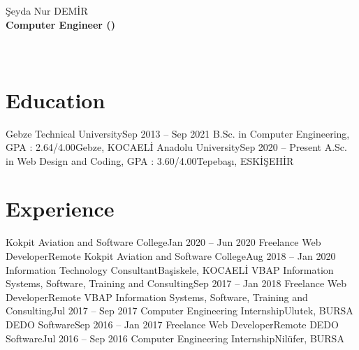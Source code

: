 \documentclass{main} %
\begin{document}
\resumeHeadStart
    \resumeTitleStart
        {\huge Şeyda Nur DEMİR } \\ 
    \resumeTitleEnd
    \resumeTitleAltStart
        {\textbf{Computer Engineer (\appliedPosition)}} \\ 
    \resumeTitleAltEnd
    \resumeTitleAltStart
        {\href{tel:+905063759015} {} 
        \href{mailto:dmrsydnr@gmail.com} {} 
        \href{https://goo.gl/maps/RmZTWTc4JpxoeGfH6} {} } \\ 
    \resumeTitleAltEnd
    \resumeTitleAltStart
        {\href{https://seydanurdemir.com} {} 
        \href{https://linkedin.com/in/seydanurdemir} {} 
        \href{https://github.com/seydanurdemir} {} } \\ 
    \resumeTitleAltEnd
\resumeHeadEnd

\section{Education}
  \resumeSubHeadingListStart
    \resumeSubheading
      {Gebze Technical University}{Sep 2013 -- Sep 2021}
      {B.Sc. in Computer Engineering, GPA : 2.64/4.00}{Gebze, KOCAELİ}
    \resumeSubheading
      {Anadolu University}{Sep 2020 -- Present}
      {A.Sc. in Web Design and Coding, GPA : 3.60/4.00}{Tepebaşı, ESKİŞEHİR}
  \resumeSubHeadingListEnd

\section{Experience}
    \resumeSubHeadingListStart
        \resumeSubheading
            {Kokpit Aviation and Software College}{Jan 2020 -- Jun 2020}
            {Freelance Web Developer}{Remote}
        \resumeSubheading
            {Kokpit Aviation and Software College}{Aug 2018 -- Jan 2020}
            {Information Technology Consultant}{Başiskele, KOCAELİ}
        \resumeSubheading
            {VBAP Information Systems, Software, Training and Consulting}{Sep 2017 -- Jan 2018}
            {Freelance Web Developer}{Remote}
        \resumeSubheading
            {VBAP Information Systems, Software, Training and Consulting}{Jul 2017 -- Sep 2017}
            {Computer Engineering Internship}{Ulutek, BURSA}
        \resumeSubheading
            {DEDO Software}{Sep 2016 -- Jan 2017}
            {Freelance Web Developer}{Remote}
        \resumeSubheading
            {DEDO Software}{Jul 2016 -- Sep 2016}
            {Computer Engineering Internship}{Nilüfer, BURSA}
    \resumeSubHeadingListEnd
\end{document}
